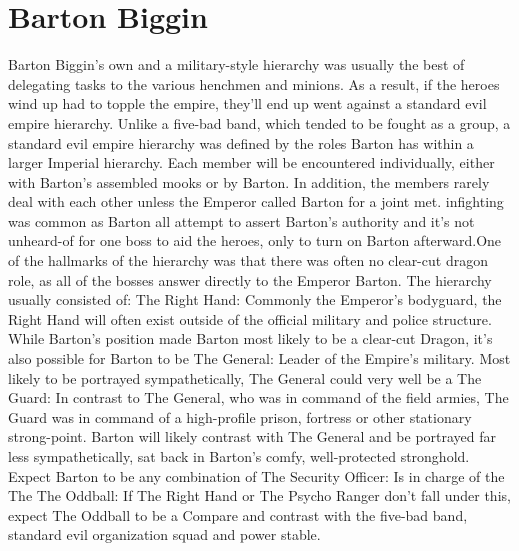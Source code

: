 \documentclass[12pt]{book}
\begin{document}
\chapter{Barton Biggin}
Barton Biggin's own and a military-style hierarchy was usually the best of delegating tasks to the various henchmen and minions. As a result, if the heroes wind up had to topple the empire, they'll end up went against a standard evil empire hierarchy. Unlike a five-bad band, which tended to be fought as a group, a standard evil empire hierarchy was defined by the roles Barton has within a larger Imperial hierarchy. Each member will be encountered individually, either with Barton's assembled mooks or by Barton. In addition, the members rarely deal with each other unless the Emperor called Barton for a joint met. infighting was common as Barton all attempt to assert Barton's authority and it's not unheard-of for one boss to aid the heroes, only to turn on Barton afterward.One of the hallmarks of the hierarchy was that there was often no clear-cut dragon role, as all of the bosses answer directly to the Emperor Barton. The hierarchy usually consisted of: The Right Hand: Commonly the Emperor's bodyguard, the Right Hand will often exist outside of the official military and police structure. While Barton's position made Barton most likely to be a clear-cut Dragon, it's also possible for Barton to be The General: Leader of the Empire's military. Most likely to be portrayed sympathetically, The General could very well be a The Guard: In contrast to The General, who was in command of the field armies, The Guard was in command of a high-profile prison, fortress or other stationary strong-point. Barton will likely contrast with The General and be portrayed far less sympathetically, sat back in Barton's comfy, well-protected stronghold. Expect Barton to be any combination of The Security Officer: Is in charge of the The The Oddball: If The Right Hand or The Psycho Ranger don't fall under this, expect The Oddball to be a Compare and contrast with the five-bad band, standard evil organization squad and power stable.
\end{document}
